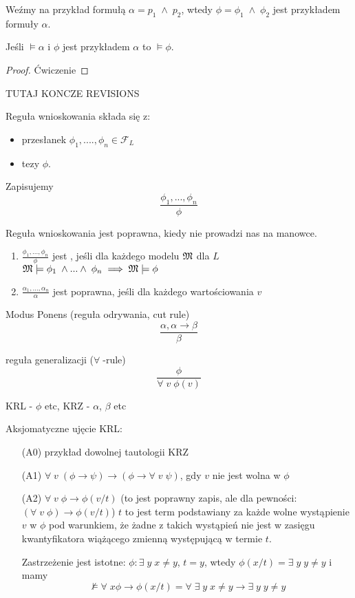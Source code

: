 Weźmy na przykład formułą $\alpha=p_1\;\land\;p_2$, wtedy $\phi=\phi_1\;\land\;\phi_2$ jest przykładem formuły $\alpha$.

\begin{theorem}{}{}
  Jeśli $\models\alpha$ i $\phi$ jest przykładem $\alpha$ to $\models\phi$.
\end{theorem}
\begin{proof}
  Ćwiczenie
\end{proof}

{\color{red}\large TUTAJ KONCZE REVISIONS}

\begin{definition}{}{}
  Reguła wnioskowania składa się z:
  \begin{itemize}
    \item przesłanek $\phi_1,....,\phi_n\in\mathcal{F}_L$
    \item tezy $\phi$.
  \end{itemize}
  Zapisujemy 
  $$\frac{\phi_1,...,\phi_n}{\phi}$$

  Reguła wnioskowania jest poprawna, kiedy nie prowadzi nas na manowce. 
  \begin{enumerate}
    \item $\frac{\phi_1,...,\phi_n}{\phi}$ jest , jeśli dla każdego modelu $\mathfrak{M}$ dla $L$ $\mathfrak{M}\models\phi_1\;\land...\land\;\phi_n\implies \mathfrak{M}\models\phi$
    \item $\frac{\alpha_1,...,\alpha_n}{\alpha}$ jest poprawna, jeśli dla każdego wartościowania $v$ 
  \end{enumerate}
\end{definition}

\begin{example}[m]
  \item Modus Ponens (reguła odrywania, cut rule) 
    $$\frac{\alpha,\alpha\to \beta}{\beta}$$
  \item reguła generalizacji ($\forall\;$-rule)
    $$\frac{\phi}{\forall\;v\;\phi(v)}$$
\end{example}

KRL - $\phi$ etc, KRZ - $\alpha$, $\beta$ etc

Aksjomatyczne ujęcie KRL:
\begin{itemize}
  \item[(A0)] przykład dowolnej tautologii KRZ
  \item[(A1)] $\forall\;v\;(\phi\to\psi)\to(\phi\to\forall\;v\;\psi)$, gdy $v$ nie jest wolna w $\phi$
  \item[(A2)] $\forall\;v\;\phi\to\phi(v/t)$ (to jest poprawny zapis, ale dla pewności: $(\forall\;v\;\phi)\to\phi(v/t)$)
    $t$ to jest term podstawiany za każde wolne wystąpienie $v$ w $\phi$ pod warunkiem, że żadne z takich wystąpień nie jest w zasięgu kwantyfikatora wiążącego zmienną występującą w termie $t$.

    Zastrzeżenie jest istotne: $\phi:\exists\;y\;x\neq y$, $t=y$, wtedy $\phi(x/t)=\exists\;y\;y\neq y$ i mamy
    $$\not\models\forall\;x\phi\to\phi(x/t)=\forall\;\exists\;y\;x\neq y\to \exists\;y\;y\neq y$$
\end{itemize}


